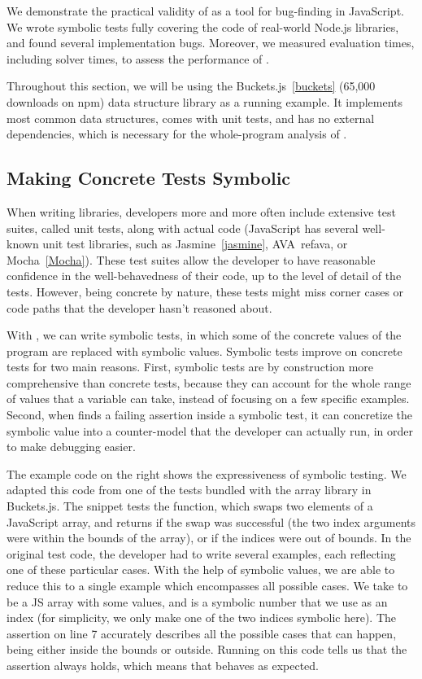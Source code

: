 
We demonstrate the practical validity of \cosette as a tool for bug-finding in JavaScript.
We wrote symbolic tests fully covering the code of real-world Node.js libraries, and found several  implementation bugs.
Moreover, we measured evaluation times, including solver times, to assess the performance of \cosette.

Throughout this section, we will be using the Buckets.js~\ref{buckets} (65,000 downloads on npm) data structure library as a running example.
It implements most common data structures, comes with unit tests, and has no external dependencies, which is necessary for the whole-program analysis of \cosette.

\subsection{Making Concrete Tests Symbolic}

When writing libraries, developers more and more often include extensive test suites, called unit tests, along with actual code (JavaScript has several well-known unit test libraries, such as Jasmine~\ref{jasmine}, AVA~ref{ava}, or Mocha~\ref{Mocha}).
These test suites allow the developer to have reasonable confidence in the well-behavedness of their code, up to the level of detail of the tests.
However, being concrete by nature, these tests might miss corner cases or code paths that the developer hasn't reasoned about.

With \cosette, we can write symbolic tests, in which some of the concrete values of the program are replaced with symbolic values.
Symbolic tests improve on concrete tests for two main reasons.
First, symbolic tests are by construction more comprehensive than concrete tests, because they can account for the whole range of values that a variable can take, instead of focusing on a few specific examples.
Second, when \cosette finds a failing assertion inside a symbolic test, it can concretize the symbolic value into a counter-model that the developer can actually run, in order to make debugging easier.

The example code on the right shows the expressiveness of symbolic testing.
We adapted this code from one of the tests bundled with the array library in Buckets.js.
The snippet tests the  function, which swaps two elements of a JavaScript array, and returns  if the swap was successful (the two index arguments were within the bounds of the array), or  if the indices were out of bounds.
In the original test code, the developer had to write several examples, each reflecting one of these particular cases.
With the help of symbolic values, we are able to reduce this to a single example which encompasses all possible cases.
We take  to be a JS array with some values, and  is a symbolic number that we use as an index (for simplicity, we only make one of the two indices symbolic here).
The assertion on line 7 accurately describes all the possible cases that can happen,  being either inside the bounds or outside.
Running \cosette on this code tells us that the assertion always holds, which means that  behaves as expected.

